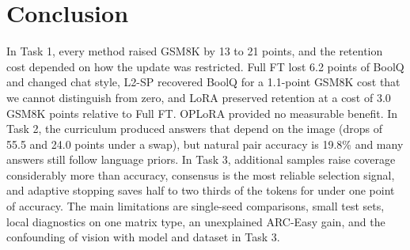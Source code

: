 \documentclass{article}
\begin{document}
\section{Conclusion}
In Task 1, every method raised GSM8K by 13 to 21 points, and the retention cost depended on how the update was restricted. Full FT lost 6.2 points of BoolQ and changed chat style, L2-SP recovered BoolQ for a 1.1-point GSM8K cost that we cannot distinguish from zero, and LoRA preserved retention at a cost of 3.0 GSM8K points relative to Full FT. OPLoRA provided no measurable benefit. In Task 2, the curriculum produced answers that depend on the image (drops of 55.5 and 24.0 points under a swap), but natural pair accuracy is 19.8\% and many answers still follow language priors. In Task 3, additional samples raise coverage considerably more than accuracy, consensus is the most reliable selection signal, and adaptive stopping saves half to two thirds of the tokens for under one point of accuracy. The main limitations are single-seed comparisons, small test sets, local diagnostics on one matrix type, an unexplained ARC-Easy gain, and the confounding of vision with model and dataset in Task 3.
\end{document}
